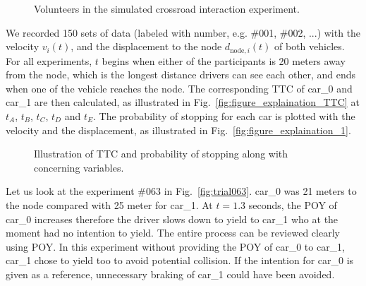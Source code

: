 \begin{figure}[htbp!]
    \centering
    \hfill
    \hfill
    \caption{Volunteers in the simulated crossroad interaction experiment.} \label{fig:Drivers}
\end{figure}

We recorded 150 sets of data (labeled with number, e.g. \#001, \#002, ...) with the velocity $v_i(t)$, and the displacement to the node $d_{\mathrm{node},i}(t)$ of both vehicles. For all experiments, $t$ begins when either of the participants is 20 meters away from the node, which is the longest distance drivers can see each other, and ends when one of the vehicle reaches the node. The corresponding TTC of car\_0 and car\_1 are then calculated, as illustrated in Fig.~\ref{fig:figure_explaination_TTC} at $t_A$, $t_B$, $t_C$, $t_D$ and $t_E$. The probability of stopping for each car is plotted with the velocity and the displacement, as illustrated in Fig.~\ref{fig:figure_explaination_1}. 


\begin{figure}[htbp!]
    \centering
    \hfill
    \hfill
    
    \caption{Illustration of TTC and probability of stopping along with concerning variables.} \label{fig:illustration}
\end{figure}

\newpage

Let us look at the experiment \#063 in Fig.~\ref{fig:trial063}. car\_0 was 21 meters to the node compared with 25 meter for car\_1. At $t=1.3$ seconds, the POY of car\_0 increases therefore the driver slows down to yield to car\_1 who at the moment had no intention to yield. The entire process can be reviewed clearly using POY. In this experiment without providing the POY of car\_0 to car\_1, car\_1 chose to yield too to avoid potential collision. If the intention for car\_0 is given as a reference, unnecessary braking of car\_1 could have been avoided.



